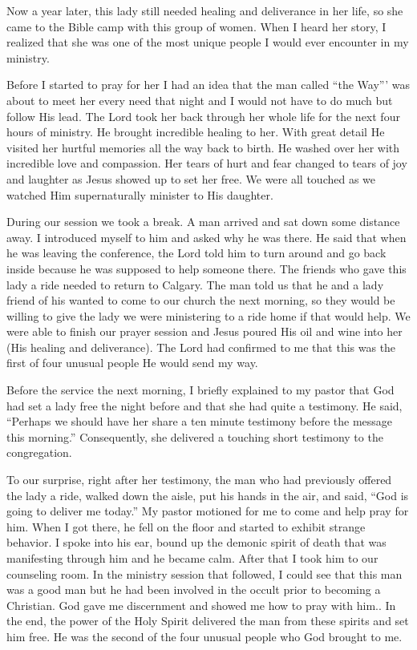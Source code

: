 \documentclass[twoside, 12pt]{book}
\begin{document}
Now a year later, this lady still needed healing and deliverance in her life, so she came to the Bible camp with this group of women. When I heard her story, I realized that she was one of the most unique people I would ever encounter in my ministry.

Before I started to pray for her I had an idea that the man called “the Way”' was about to meet her every need that night and I would not have to do much but follow His lead. The Lord took her back through her whole life for the next four hours of ministry. He brought incredible healing to her. With great detail He visited her hurtful memories all the way back to birth. He washed over her with incredible love and compassion. Her tears of hurt and fear changed to tears of joy and laughter as Jesus showed up to set her free. We were all touched as we watched Him supernaturally minister to His daughter.

During our session we took a break. A man arrived and sat down some distance away. I introduced myself to him and asked why he was there. He said that when he was leaving the conference, the Lord told him to turn around and go back inside because he was supposed to help someone there. The friends who gave this lady a ride needed to return to Calgary. The man told us that he and a lady friend of his wanted to come to our church the next morning, so they would be willing to give the lady we were ministering to a ride home if that would help. We were able to finish our prayer session and Jesus poured His oil and wine into her (His healing and deliverance). The Lord had confirmed to me that this was the first of four unusual people He would send my way.

Before the service the next morning, I briefly explained to my pastor that God had set a lady free the night before and that she had quite a testimony. He said, “Perhaps we should have her share a ten minute testimony before the message this morning.” Consequently, she delivered a touching short testimony to the congregation.

To our surprise, right after her testimony, the man who had previously offered the lady a ride, walked down the aisle, put his hands in the air, and said, “God is going to deliver me today.” My pastor motioned for me to come and help pray for him. When I got there, he fell on the floor and started to exhibit strange behavior. I spoke into his ear, bound up the demonic spirit of death that was manifesting through him and he became calm. After that I took him to our counseling room. In the ministry session that followed, I could see that this man was a good man but he had been involved in the occult prior to becoming a Christian. God gave me discernment and showed me how to pray with him.. In the end, the power of the Holy Spirit delivered the man from these spirits and set him free. He was the second of the four unusual people who God brought to me.
\end{document}
